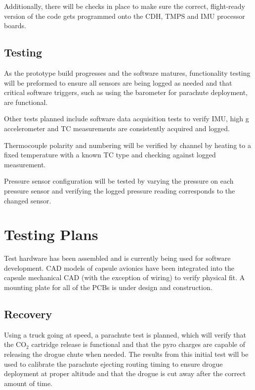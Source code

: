 \documentclass{article}
\begin{document}
Additionally, there will be checks in place to make sure the correct, flight-ready version of the code gets programmed onto the CDH, TMPS and IMU processor boards.

\subsection{Testing}
As the prototype build progresses and the software matures, functionality testing will be preformed to ensure all sensors are being logged as needed and that critical software triggers, such as using the barometer for parachute deployment, are functional.

Other tests planned include software data acquisition tests to verify IMU, high g accelerometer and TC measurements are consistently acquired and logged.

Thermocouple polarity and numbering will be verified by channel by heating to a fixed temperature with a known TC type and checking against logged measurement.

Pressure sensor configuration will be tested by varying the pressure on each pressure sensor and verifying the logged pressure reading corresponds to the changed sensor.


\section{Testing Plans}
\label{sec:testplans}

Test hardware has been assembled and is currently being used for software development. CAD models of capsule avionics have been integrated into the capsule mechanical CAD (with the exception of wiring) to verify physical fit. A mounting plate for all of the PCBs is under design and construction.

\subsection{Recovery}
Using a truck going at speed, a parachute test is planned, which will verify that the CO$_2$ cartridge release is functional and that the pyro charges are capable of releasing the drogue chute when needed. The results from this initial test will be used to calibrate the parachute ejecting routing timing to ensure drogue deployment at proper altitude and that the drogue is cut away after the correct amount of time.
\end{document}
